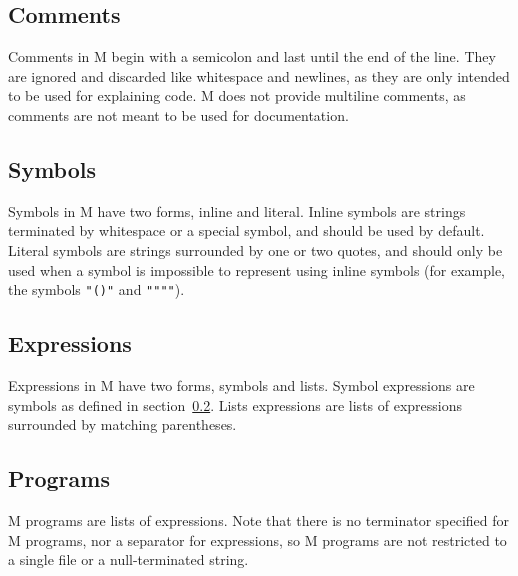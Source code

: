 \documentclass[11pt]{article}
\begin{document}
    \subsection{Comments}\label{subsec:comments}

    \begin{minipage}{\columnwidth}
        Comments in M begin with a semicolon and last until the end of the line.
        They are ignored and discarded like whitespace and newlines, as they are only intended to be used for explaining code.
        M does not provide multiline comments, as comments are not meant to be used for documentation.
    \end{minipage}

    \subsection{Symbols}\label{subsec:symbols}

    \begin{minipage}{\columnwidth}
        Symbols in M have two forms, inline and literal.
        Inline symbols are strings terminated by whitespace or a special symbol, and should be used by default.
        Literal symbols are strings surrounded by one or two quotes, and should only be used when a symbol is impossible to represent using inline symbols (for example, the symbols \texttt{"()"} and \texttt{""""}).
    \end{minipage}

    \subsection{Expressions}\label{subsec:expressions}

    \begin{minipage}{\columnwidth}
        Expressions in M have two forms, symbols and lists.
        Symbol expressions are symbols as defined in section~\ref{subsec:symbols}.
        Lists expressions are lists of expressions surrounded by matching parentheses.
    \end{minipage}

    \subsection{Programs}\label{subsec:programs}

    \begin{minipage}{\columnwidth}
        M programs are lists of expressions.
        Note that there is no terminator specified for M programs, nor a separator for expressions, so M programs are not restricted to a single file or a null-terminated string.
    \end{minipage}
    \newpage
\end{document}
